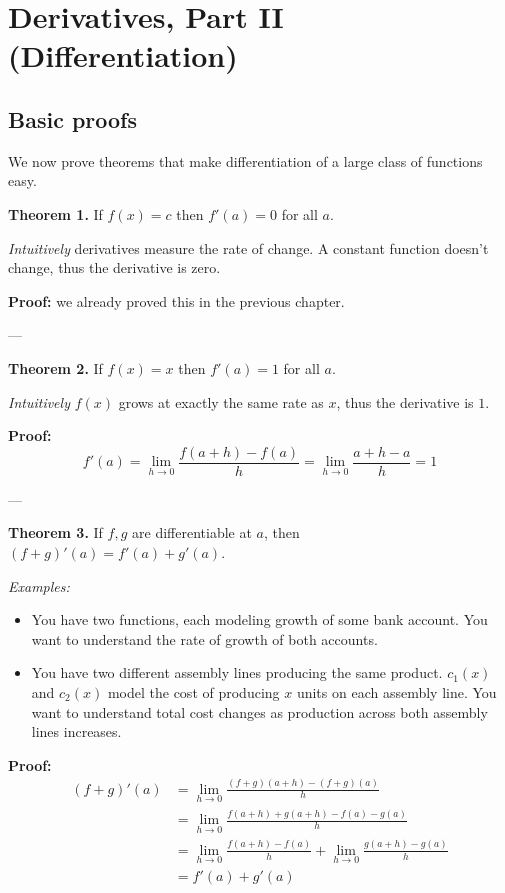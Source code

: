 
\section{Derivatives, Part II (Differentiation)}

\subsection{Basic proofs}

We now prove theorems that make differentiation of a large class of
functions easy.

\vs

\textbf{Theorem 1.} If $f(x)=c$ then $f'(a)=0$ for all $a$.

\vs

\textit{Intuitively} derivatives measure the rate of change. A
constant function doesn't change, thus the derivative is zero.

\vs

\textbf{Proof:} we already proved this in the previous chapter.

\vs---\vs

\textbf{Theorem 2.} If $f(x)=x$ then $f'(a)=1$ for all $a$.

\vs

\textit{Intuitively} $f(x)$ grows at exactly the same rate as $x$,
thus the derivative is $1$.

\vs

\textbf{Proof:}
\[f'(a)=\lim_{h\to0}\frac{f(a+h)-f(a)}{h}=\lim_{h\to0}\frac{a+h-a}{h}=1\]

\vs---\vs

\textbf{Theorem 3.} If $f,g$ are differentiable at $a$, then
$(f+g)'(a)=f'(a)+g'(a)$.

\vs
\textit{Examples:}
\begin{itemize}
\item You have two functions, each modeling growth of some bank
  account. You want to understand the rate of growth of both accounts.
\item You have two different assembly lines producing the same
  product. $c_1(x)$ and $c_2(x)$ model the cost of producing $x$
  units on each assembly line. You want to understand total cost
  changes as production across both assembly lines increases.
\end{itemize}

\textbf{Proof:}
\begin{align*}
  (f+g)'(a)&=\lim_{h\to0}\frac{(f+g)(a+h)-(f+g)(a)}{h}\\
           &=\lim_{h\to0}\frac{f(a+h)+g(a+h)-f(a)-g(a)}{h}\\
           &=\lim_{h\to0}\frac{f(a+h)-f(a)}{h} +
             \lim_{h\to0}\frac{g(a+h)-g(a)}{h}\\
           &=f'(a)+g'(a)
\end{align*}

